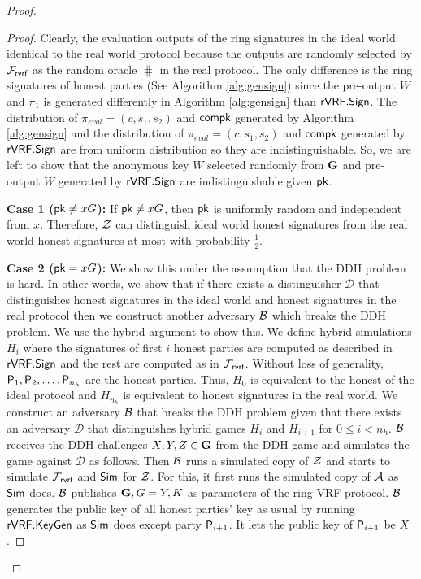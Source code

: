 \begin{proof}
		\begin{proof}
			Clearly, the evaluation outputs of the ring signatures in the ideal world identical to the real world protocol because  the outputs are randomly selected by $ \mathcal{F}_{\textsf{rvrf}} $ as the random oracle $ \hash $ in the real protocol. The only difference is the ring signatures of honest parties (See Algorithm \ref{alg:gensign}) since the pre-output $ W $ and $ \pi_1 $ is generated differently in Algorithm \ref{alg:gensign} than $ {\mathsf{rVRF}}.{\mathsf{Sign}} $. The distribution of $ \pi_{eval} = (c,s_1, s_2) $ and $ \mathsf{compk} $ generated by Algorithm \ref{alg:gensign} and the distribution of $ \pi_{eval} = (c,s_1, s_2) $ and $ \mathsf{compk} $ generated by $ {\mathsf{rVRF}}.{\mathsf{Sign}} $ are from uniform distribution so they are indistinguishable. So, we are left to show that the anonymous key $ W $ selected randomly from $ {\mathbf{G}} $ and pre-output $	 W $ generated by $ {\mathsf{rVRF}}.{\mathsf{Sign}} $ are indistinguishable given $ \mathsf{pk}  $. 
			
			\textbf{Case 1 ($ \mathsf{pk} \neq x G$):} If  $ \mathsf{pk} \neq x G$, then  $ \mathsf{pk} $ is uniformly random and independent from $ x $. Therefore, $ \mathcal{Z} $ can distinguish ideal world honest signatures from the real world honest signatures at most with probability $ \frac{1}{2} $.
			
			\textbf{Case 2 ($ \mathsf{pk} = x G$):} We  show this under the assumption that the DDH problem  is hard.  In other words, we show that if there exists a distinguisher $ \mathcal{D} $ that distinguishes honest signatures in the ideal world and honest signatures in the real protocol then we construct another adversary $ \mathcal{B} $ which breaks the DDH problem. 
			We use the hybrid argument to show this.
			We define hybrid simulations $ H_{i} $ where  the signatures of first $ i $ honest parties are computed as described in $ {\mathsf{rVRF}}.{\mathsf{Sign}} $ and the rest are computed as in $ \mathcal{F}_{\textsf{rvrf}} $. Without loss of generality, $ \mathsf{P}_1, \mathsf{P}_2, \ldots, \mathsf{P}_{n_h} $ are the honest parties. Thus, $ H_0 $ is equivalent to the honest of the ideal protocol  and $ H_{n_h}  $ is equivalent to  honest signatures in the real world.  We construct an adversary $ \mathcal{B} $ that breaks the DDH problem given that there exists an adversary $ \mathcal{D} $ that distinguishes hybrid games $ H_i $ and $ H_{i + 1} $ for $ 0 \leq i < n_h $. $\mathcal{B} $ receives the DDH challenges $ X,Y, Z \in {\mathbf{G}} $ from the DDH game and simulates the game against $ \mathcal{D} $ as follows. 
			Then $ \mathcal{B} $ runs a simulated copy of $ \mathcal{Z} $ and starts to simulate $ \mathcal{F}_{\textsf{rvrf}} $ and $ \mathsf{Sim} $ for $ \mathcal{Z} $. For this, it first runs the simulated copy of $ \mathcal{A} $ as $ \mathsf{Sim} $ does. $  \mathcal{B} $ publishes $ {\mathbf{G}}, G = Y, K $ as parameters of the ring VRF protocol. $\mathcal{B} $ generates the public key of all  honest parties' key as usual by running $ {\mathsf{rVRF}}.{\mathsf{KeyGen}}$ as $ \mathsf{Sim} $ does except party $ \mathsf{P}_{i+1} $. It lets the public key of $ \mathsf{P}_{i + 1} $ be $ X $.
		

\end{proof}
\end{proof}
